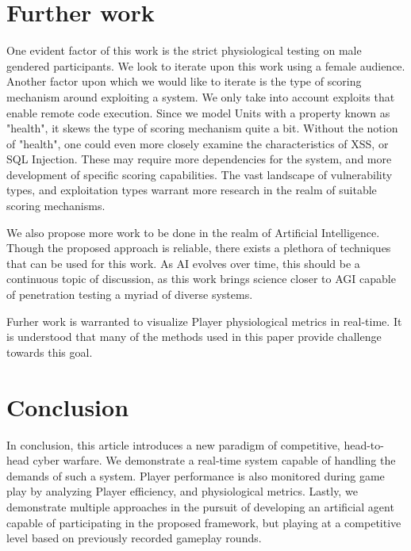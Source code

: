 \documentclass[10pt, titlepage, twocolumn]{article}
\begin{document}
\section{Further work}
One evident factor of this work is the strict physiological testing on male gendered participants. We look to iterate upon this work using a female audience. Another factor upon which we would like to iterate is the type of scoring mechanism around exploiting a system. We only take into account exploits that enable remote code execution. Since we model Units with a property known as "health", it skews the type of scoring mechanism quite a bit. Without the notion of "health", one could even more closely examine the characteristics of XSS, or SQL Injection. These may require more dependencies for the system, and more development of specific scoring capabilities. The vast landscape of vulnerability types, and exploitation types warrant more research in the realm of suitable scoring mechanisms.

We also propose more work to be done in the realm of Artificial Intelligence. Though the proposed approach is reliable, there exists a plethora of techniques that can be used for this work. As AI evolves over time, this should be a continuous topic of discussion, as this work brings science closer to AGI capable of penetration testing a myriad of diverse systems.

Furher work is warranted to visualize Player physiological metrics in real-time. It is understood that many of the methods used in this paper provide challenge towards this goal. 

\section{Conclusion}
In conclusion, this article introduces a new paradigm of competitive, head-to-head cyber warfare. We demonstrate a real-time system capable of handling the demands of such a system. Player performance is also monitored during game play by analyzing Player efficiency, and physiological metrics. Lastly, we demonstrate multiple approaches in the pursuit of developing an artificial agent capable of participating in the proposed framework, but playing at a competitive level based on previously recorded gameplay rounds.
\end{document}
